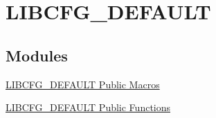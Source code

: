 \hypertarget{group___l_i_b_c_f_g___d_e_f_a_u_l_t}{\section{\-L\-I\-B\-C\-F\-G\-\_\-\-D\-E\-F\-A\-U\-L\-T}
\label{group___l_i_b_c_f_g___d_e_f_a_u_l_t}
}
\subsection*{\-Modules}
\begin{DoxyCompactItemize}
\item 
\hyperlink{group___l_i_b_c_f_g___d_e_f_a_u_l_t___public___macros}{\-L\-I\-B\-C\-F\-G\-\_\-\-D\-E\-F\-A\-U\-L\-T Public Macros}
\item 
\hyperlink{group___l_i_b_c_f_g___d_e_f_a_u_l_t___public___functions}{\-L\-I\-B\-C\-F\-G\-\_\-\-D\-E\-F\-A\-U\-L\-T Public Functions}
\end{DoxyCompactItemize}
